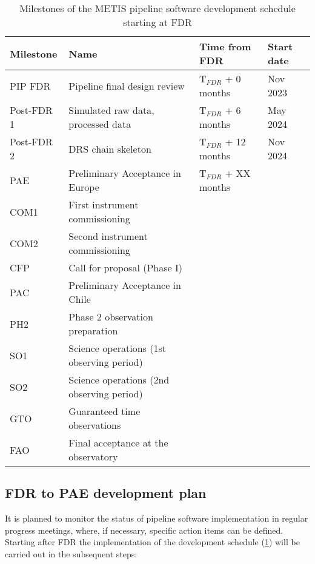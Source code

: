 \begin{table}
    \caption[Development schedule]{Milestones of the METIS pipeline software development schedule starting at FDR}
  \label{tab:development_schedule}
  \centering\scriptsize
  \begin{tabularx}{\textwidth}{llll}
    \hline
    Milestone & Name & Time from FDR & Start date \\
    \hline\hline
    PIP FDR          & Pipeline final design review & T$_ {FDR}$ + 0 months & Nov 2023 \\
    Post-FDR 1       & Simulated raw data, processed data &  T$_ {FDR}$ + 6 months & May 2024 \\
    Post-FDR 2       & DRS chain skeleton               &  T$_{FDR}$ + 12 months & Nov 2024 \\
    PAE              & Preliminary Acceptance in Europe &  T$_{FDR}$ + XX months &  \\
    COM1             & First instrument commissioning &  & \\
    COM2             & Second instrument commissioning &  & \\
    CFP              & Call for proposal (Phase I) &  & \\
    PAC              & Preliminary Acceptance in Chile &  & \\
    PH2              & Phase 2 observation preparation &  & \\
    SO1              & Science operations (1st observing period) &  & \\
    SO2              & Science operations (2nd observing period) &  & \\
    GTO              & Guaranteed time observations &  & \\
    FAO              & Final acceptance at the observatory & & \\
    \hline
  \end{tabularx}
\end{table}

\subsection{FDR to PAE development plan}
\label{ssec:fdr2pae}

It is planned to monitor the status of pipeline software implementation in regular progress meetings, where, if necessary, specific action items can be defined. Starting after FDR the implementation of the development schedule (\ref{tab:development_schedule}) will be carried out in the subsequent steps:

